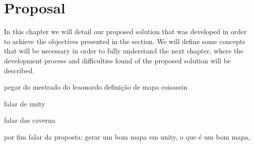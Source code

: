 \chapter{Proposal}

In this chapter we will detail our proposed solution that was developed in order to achieve the objectives presented in the  section. We will define some concepts that will be necessary in order to fully understand the next chapter, where the development process and difficulties found of the proposed solution will be described.


pegar do mestrado do leaonardo definição de mapa coisassin

falar de unity

falar das caverna

por fim falar da proposta: gerar um bom mapa em unity, o que é um bom mapa,
